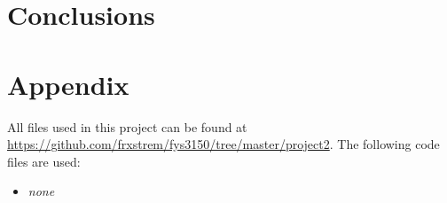\documentclass[11pt,a4paper]{article}
\begin{document}
\section{Conclusions}

\clearpage
\appendix
\section{Appendix}

All files used in this project can be found at \url{https://github.com/frxstrem/fys3150/tree/master/project2}.
The following code files are used:
\begin{itemize}
  \item {\it \color{red} none}
\end{itemize}

\clearpage

\printbibliography[heading=bibnumbered,title=Bibliography]
\end{document}
